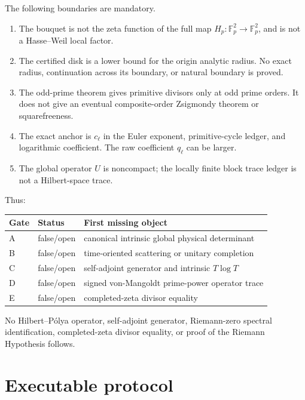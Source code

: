 \documentclass[11pt]{article}
\numberwithin{equation}{section}
\theoremstyle{remark}
\begin{document}
The following boundaries are mandatory.
\begin{enumerate}
\item The bouquet is not the zeta function of the full map
\(H_p:\mathbb F_p^2\to\mathbb F_p^2\), and is not a Hasse--Weil local factor.
\item The certified disk is a lower bound for the origin analytic radius.  No
exact radius, continuation across its boundary, or natural boundary is
proved.
\item The odd-prime theorem gives primitive divisors only at odd prime
orders.  It does not give an eventual composite-order Zsigmondy theorem or
squarefreeness.
\item The exact anchor is \(c_\ell\) in the Euler exponent, primitive-cycle
ledger, and logarithmic coefficient.  The raw coefficient \(q_\ell\) can be
larger.
\item The global operator \(U\) is noncompact; the locally finite block trace
ledger is not a Hilbert-space trace.
\end{enumerate}

Thus:
\begin{center}
\begin{tabular}{lll}
\toprule
Gate & Status & First missing object \\
\midrule
A & false/open & canonical intrinsic global physical determinant \\
B & false/open & time-oriented scattering or unitary completion \\
C & false/open & self-adjoint generator and intrinsic \(T\log T\) \\
D & false/open & signed von-Mangoldt prime-power operator trace \\
E & false/open & completed-zeta divisor equality \\
\bottomrule
\end{tabular}
\end{center}

No Hilbert--P\'olya operator, self-adjoint generator, Riemann-zero spectral
identification, completed-zeta divisor equality, or proof of the Riemann
Hypothesis follows.

\section{Executable protocol}
\end{document}
